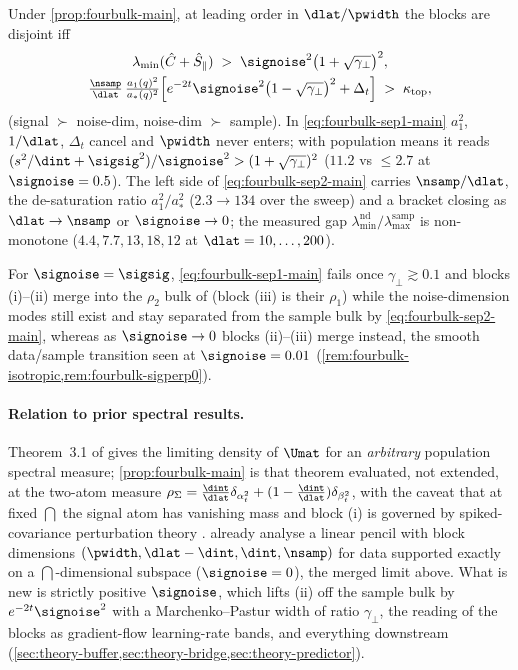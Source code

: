 \begin{corollary}\label{cor:fourbulk-separation-main}
Under \cref{prop:fourbulk-main}, at leading order in $\dlat/\pwidth$ the blocks are disjoint iff
\begin{gather}
\lambda_{\min}(\hat C+\hat S_\parallel)\;>\;\signoise^2\bigl(1+\sqrt{\gamma_\perp}\bigr)^2,\label{eq:fourbulk-sep1-main}\\
\tfrac{\nsamp}{\dlat}\,\tfrac{a_1(q)^2}{a_*(q)^2}\Bigl[e^{-2t}\signoise^2\bigl(1-\sqrt{\gamma_\perp}\bigr)^2+\Delta_t\Bigr]\;>\;\kappa_{\mathrm{top}} ,\label{eq:fourbulk-sep2-main}
\end{gather}
(signal $\succ$ noise-dim, noise-dim $\succ$ sample). In \eqref{eq:fourbulk-sep1-main} $a_1^2$, $1/\dlat$, $\Delta_t$ cancel and $\pwidth$ never enters; with population means it reads $(s^2/\dint+\sigsig^2)/\signoise^2>(1+\sqrt{\gamma_\perp})^2$ ($11.2$ vs $\le2.7$ at $\signoise=0.5$). The left side of \eqref{eq:fourbulk-sep2-main} carries $\nsamp/\dlat$, the de-saturation ratio $a_1^2/a_*^2$ ($2.3\to134$ over the sweep) and a bracket closing as $\dlat\to\nsamp$ or $\signoise\to0$; the measured gap $\lambda^{\mathrm{nd}}_{\min}/\lambda^{\mathrm{samp}}_{\max}$ is non-monotone ($4.4,7.7,13,18,12$ at $\dlat=10,\dots,200$).
\end{corollary}
For $\signoise=\sigsig$, \eqref{eq:fourbulk-sep1-main} fails once $\gamma_\perp\gtrsim0.1$ and blocks (i)--(ii) merge into the $\rho_2$ bulk of \citet{bonnaire2025} (block (iii) is their $\rho_1$) while the noise-dimension modes still exist and stay separated from the sample bulk by \eqref{eq:fourbulk-sep2-main}, whereas as $\signoise\to0$ blocks (ii)--(iii) merge instead, the smooth data/sample transition seen at $\signoise=0.01$ (\cref{rem:fourbulk-isotropic,rem:fourbulk-sigperp0}).

\paragraph{Relation to prior spectral results.}
Theorem~3.1 of \citet{bonnaire2025} gives the limiting density of $\Umat$ for an \emph{arbitrary} population spectral measure; \cref{prop:fourbulk-main} is that theorem evaluated, not extended, at the two-atom measure $\rho_\Sigma=\tfrac{\dint}{\dlat}\delta_{\alpha_t^2}+(1-\tfrac{\dint}{\dlat})\delta_{\beta_t^2}$, with the caveat that at fixed $\dint$ the signal atom has vanishing mass and block (i) is governed by spiked-covariance perturbation theory \citep{baik2005phase}. \citet{george2025dsm} already analyse a linear pencil with block dimensions $(\pwidth,\dlat-\dint,\dint,\nsamp)$ for data supported exactly on a $\dint$-dimensional subspace ($\signoise=0$), the merged limit above. What is new is strictly positive $\signoise$, which lifts (ii) off the sample bulk by $e^{-2t}\signoise^2$ with a Marchenko--Pastur width of ratio $\gamma_\perp$, the reading of the blocks as gradient-flow learning-rate bands, and everything downstream (\cref{sec:theory-buffer,sec:theory-bridge,sec:theory-predictor}).

